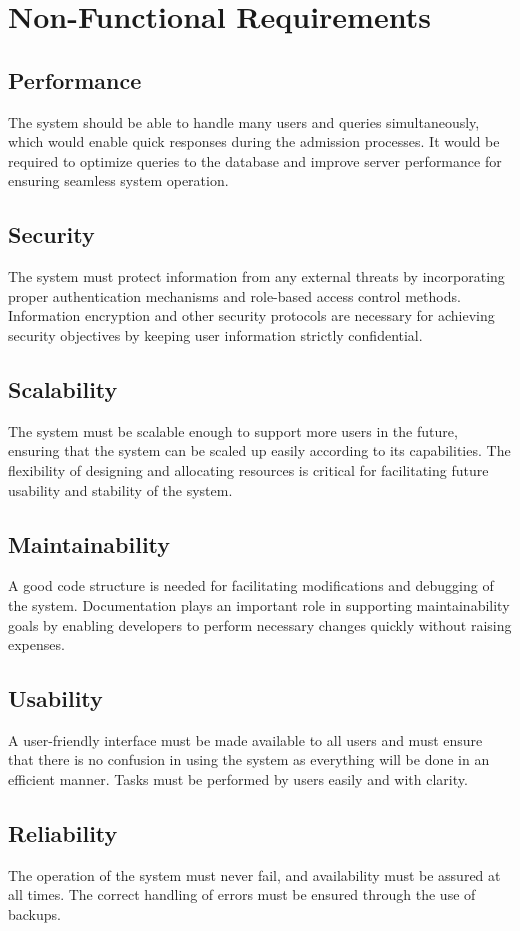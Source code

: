 \section{Non-Functional Requirements}

\subsection{Performance}
The system should be able to handle many users and queries simultaneously, which would enable quick responses during the admission processes. It would be required to optimize queries to the database and improve server performance for ensuring seamless system operation.

\subsection{Security}
The system must protect information from any external threats by incorporating proper authentication mechanisms and role-based access control methods. Information encryption and other security protocols are necessary for achieving security objectives by keeping user information strictly confidential.

\subsection{Scalability}
The system must be scalable enough to support more users in the future, ensuring that the system can be scaled up easily according to its capabilities. The flexibility of designing and allocating resources is critical for facilitating future usability and stability of the system.

\subsection{Maintainability}
A good code structure is needed for facilitating modifications and debugging of the system. Documentation plays an important role in supporting maintainability goals by enabling developers to perform necessary changes quickly without raising expenses. 

\subsection{Usability}
A user-friendly interface must be made available to all users and must ensure that there is no confusion in using the system as everything will be done in an efficient manner. Tasks must be performed by users easily and with clarity.

\subsection{Reliability}
The operation of the system must never fail, and availability must be assured at all times. The correct handling of errors must be ensured through the use of backups.